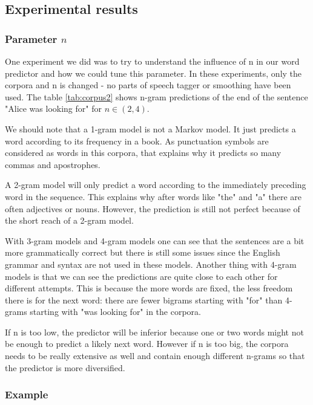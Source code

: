 \documentclass[a4paper,12pt]{article}
\begin{document}
\subsection{Experimental results}
\subsubsection{Parameter $n$}
	One experiment we did was to try to understand the influence of n in our word predictor and how we could tune this parameter. In these experiments, only the corpora and n is changed - no parts of speech tagger or smoothing have been used. The table \ref{tab:corpus2} shows n-gram predictions of the end of the sentence "Alice was looking for" for $ n\in(2,4) $.
	
We should note that a 1-gram model is not a Markov model. It just predicts a word according to its frequency in a book. As punctuation symbols are considered as words in this corpora, that explains why it predicts so many commas and apostrophes. 

A 2-gram model will only predict a word according to the immediately preceding word in the sequence. This explains why after words like "the" and "a" there are often adjectives or nouns. However, the prediction is still not perfect because of the short reach of a 2-gram model.

With 3-gram models and 4-gram models one can see that the sentences are a bit more grammatically correct but there is still some issues since the English grammar and syntax are not used in these models. Another thing with 4-gram models is that we can see the predictions are quite close to each other for different attempts. This is because the more words are fixed, the less freedom there is for the next word: there are fewer bigrams starting with "for" than 4-grams starting with "was looking for" in the corpora.
	
If n is too low, the predictor will be inferior because one or two words might not be enough to predict a likely next word. However if n is too big, the corpora needs to be really extensive as well and contain enough different n-grams so that the predictor is more diversified.

\subsubsection{Example}
\end{document}
